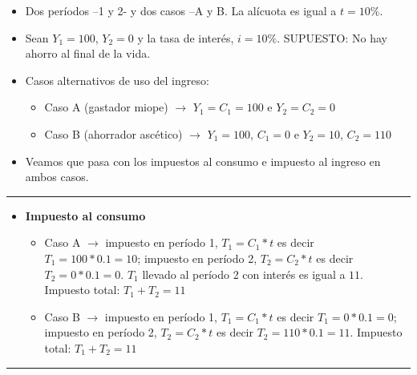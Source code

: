 \documentclass[
  letterpaper,
  DIV=11,
  numbers=noendperiod]{scrartcl}
\providecommand{\tightlist}{%
  \setlength{\itemsep}{0pt}\setlength{\parskip}{0pt}}\usepackage{longtable,booktabs,array}
\begin{document}
\begin{itemize}
\tightlist
\item
  Dos períodos --1 y 2- y dos casos --A y B. La alícuota es igual a
  \(t=10\%\).
\item
  Sean \(Y_1=100\), \(Y_2=0\) y la tasa de interés, \(i=10\%\).
  SUPUESTO: No hay ahorro al final de la vida.
\item
  Casos alternativos de uso del ingreso:

  \begin{itemize}
  \tightlist
  \item
    Caso A (gastador miope) \(\longrightarrow\) \(Y_1=C_1=100\) e
    \(Y_2=C_2=0\)
  \item
    Caso B (ahorrador ascético) \(\longrightarrow\) \(Y_1=100\),
    \(C_1=0\) e \(Y_2=10\), \(C_2=110\)
  \end{itemize}
\item
  Veamos que pasa con los impuestos al consumo e impuesto al ingreso en
  ambos casos.
\end{itemize}

\begin{center}\rule{0.5\linewidth}{0.5pt}\end{center}

\begin{itemize}
\tightlist
\item
  \textbf{Impuesto al consumo}

  \begin{itemize}
  \tightlist
  \item
    Caso A \(\longrightarrow\) impuesto en período 1, \(T_1=C_1*t\) es
    decir \(T_1=100*0.1=10\); impuesto en período 2, \(T_2=C_2*t\) es
    decir \(T_2=0*0.1=0\). \(T_1\) llevado al período 2 con interés es
    igual a \(11\). Impuesto total: \(T_1+T_2=11\)
  \item
    Caso B \(\longrightarrow\) impuesto en período 1, \(T_1=C_1*t\) es
    decir \(T_1=0*0.1=0\); impuesto en período 2, \(T_2=C_2*t\) es decir
    \(T_2=110*0.1=11\). Impuesto total: \(T_1+T_2=11\)
  \end{itemize}
\end{itemize}

\begin{center}\rule{0.5\linewidth}{0.5pt}\end{center}
\end{document}
